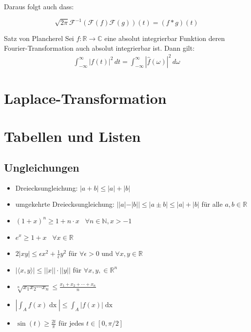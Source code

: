 \documentclass[a4paper,10pt]{article}
\def\R{\mathbb{R}}
\begin{document}
Daraus folgt auch dass:

\begin{equation*}
  \sqrt{2\pi}\mathcal{F}^{-1}(\mathcal{F}(f)\mathcal{F}(g))(t)=(f*g)(t)
\end{equation*}

\begin{subbox}{Satz von Plancherel}
  Sei \(f\colon\mathbb{R}\to\mathbb{C}\) eine absolut integrierbar Funktion deren Fourier-Transformation auch absolut integrierbar ist. Dann gilt: \begin{align*} \int_{-\infty}^{\infty} |f(t)|^2 \,dt = \int_{-\infty}^{\infty} |\hat{f}(\omega )|^2\,d\omega \end{align*}
\end{subbox}

\section{Laplace-Transformation}

\section{Tabellen und Listen}

\subsection{Ungleichungen}

\begin{itemize}
  \item Dreiecksungleichung: $|a + b| \leq |a| + |b|$
  \item umgekehrte Dreiecksungleichung: $||a| - |b|| \leq |a \pm b| \leq |a| + |b|$ für alle $a,b \in \R$
  \item $(1+x)^n \geq 1+ n\cdot x$ \, $\forall n\in \mathbb{N}, x > -1$
  \item $e^x \geq 1 + x$ \, $\forall x\in \mathbb{R}$
  \item $2|xy| \leq \epsilon x^2 + \frac{1}{\epsilon} y^2$ für $\forall \epsilon > 0$ und $\forall x,y \in \mathbb{R}$
  \item $|\langle x,y \rangle| \leq ||x|| \cdot ||y||$ für $\forall x,y, \in \mathbb{R}^n$
  \item $\sqrt[n]{x_1 x_2 \cdots x_n} \leq \frac{x_1 + x_2 + \cdots + x_n}{n}$
  \item $\left| \int_A f(x) \mathop{dx}\right| \le \int_A \left|f(x)\right| \mathop{dx}$
  \item $\sin(t) \geq \frac{2t}{\pi}$ für jedes $t \in [0, \pi/2]$
\end{itemize}
\end{document}
